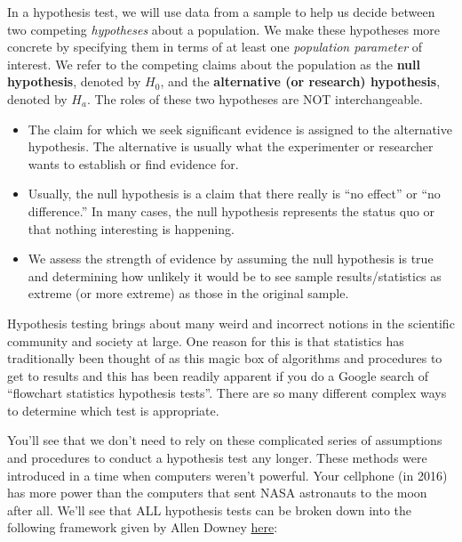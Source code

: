 \documentclass[]{tufte-book}
\providecommand{\tightlist}{%
  \setlength{\itemsep}{0pt}\setlength{\parskip}{0pt}}
\begin{document}
In a hypothesis test, we will use data from a sample to help us decide
between two competing \emph{hypotheses} about a population. We make
these hypotheses more concrete by specifying them in terms of at least
one \emph{population parameter} of interest. We refer to the competing
claims about the population as the \textbf{null hypothesis}, denoted by
\(H_0\), and the \textbf{alternative (or research) hypothesis}, denoted
by \(H_a\). The roles of these two hypotheses are NOT interchangeable.

\begin{itemize}
\tightlist
\item
  The claim for which we seek significant evidence is assigned to the
  alternative hypothesis. The alternative is usually what the
  experimenter or researcher wants to establish or find evidence for.
\item
  Usually, the null hypothesis is a claim that there really is ``no
  effect'' or ``no difference.'' In many cases, the null hypothesis
  represents the status quo or that nothing interesting is happening.\\
\item
  We assess the strength of evidence by assuming the null hypothesis is
  true and determining how unlikely it would be to see sample
  results/statistics as extreme (or more extreme) as those in the
  original sample.
\end{itemize}

Hypothesis testing brings about many weird and incorrect notions in the
scientific community and society at large. One reason for this is that
statistics has traditionally been thought of as this magic box of
algorithms and procedures to get to results and this has been readily
apparent if you do a Google search of ``flowchart statistics hypothesis
tests''. There are so many different complex ways to determine which
test is appropriate.

You'll see that we don't need to rely on these complicated series of
assumptions and procedures to conduct a hypothesis test any longer.
These methods were introduced in a time when computers weren't powerful.
Your cellphone (in 2016) has more power than the computers that sent
NASA astronauts to the moon after all. We'll see that ALL hypothesis
tests can be broken down into the following framework given by Allen
Downey
\href{http://allendowney.blogspot.com/2016/06/there-is-still-only-one-test.html}{here}:
\end{document}

